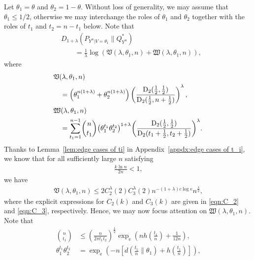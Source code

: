 \documentclass[journal, 10pt]{IEEEtran}
\newcommand{\rme}{\mathrm{e}}
\newcommand{\mfrakV}{\mathfrak{V}}
\newcommand{\mfrakW}{\mathfrak{W}}
\theoremstyle{plain}
\theoremstyle{plain}
\theoremstyle{plain}
\theoremstyle{plain}
\newcommand{\opD}{\operatorname{D}}
\begin{document}
\begin{IEEEproof}
Let $\theta_1=\theta$ and $\theta_2=1-\theta$. Without loss of generality, we may assume that $\theta_1\le 1/2$, otherwise we may interchange the roles of $\theta_1$ and $\theta_2$ together with the roles of $t_1$ and $t_2=n-t_1$ below. Note that
\begin{align}
&D_{1+\lambda}(P_{Y^n|V=\theta_1}\| Q^{\ast}_{Y^n})  \nonumber \\
&\qquad = \frac{1}{\lambda} \log (\mfrakV(\lambda, \theta_1, n) +\mfrakW(\lambda, \theta_1, n))\text{,} \label{eqn:term_in_square_bracket}
\end{align}
where
\begin{align}
&\mfrakV(\lambda, \theta_1, n) \nonumber \\
&\quad = \left( \theta_1^{n(1+\lambda)}+  \theta_2^{n(1+\lambda)} \right)\left(  \frac{\opD_{2}(\frac12, \frac12)}{\opD_2(\frac12, n+\frac12)} \right)^\lambda\text{,} \label{eqn:def:frakV-k=2} \\
&\mfrakW(\lambda, \theta_1, n) \nonumber \\
&\quad =\sum_{t_1=1}^{n-1}\hspace{-0.5mm} \binom{n}{t_1} \hspace{-0.5mm} \left( \theta_1^{t_1} \theta_2^{t_2} \right)^{1+\lambda} \hspace{-0.5mm}\bigg(\frac{\opD_{2}(\frac12, \frac12)}{\opD_2(t_1+\frac12, t_2+\frac12)} \bigg)^\lambda\text{.} \label{eqn:def:frakW-k=2}
\end{align}
Thanks to Lemma~\ref{lem:edge cases of ti} in Appendix~\ref{appdx:edge cases of t_i}, we know that for all sufficiently large $n$ satisfying
\begin{align}
	\frac{k\ln n}{2n}<1\text{,}
\end{align}
we have
\begin{align}
\mfrakV(\lambda, \theta_1, n) \le  2C_2^\lambda(2) C_3^\lambda(2)n^{-(1+\lambda)c\log \rme }n^{\frac{\lambda}{2}}\text{,} \label{k=2_upp_bound_1}
\end{align}
where the explicit expressions for $C_2(k)$ and $C_3(k)$ are given in \eqref{eqn:C_2} and \eqref{eqn:C_3}, respectively. Hence, we may now focus attention on $\mfrakW(\lambda, \theta_1, n) $. Note that
\begin{align}
 \binom{n}{t_1} &\le \left(\frac{n}{2\pi t_1t_2}\right)^\frac12 
\exp_\rme\left(nh\left(\tfrac{t_1}{n}\right)+\tfrac{1}{12n}\right)  \label{bdaa} \text{,} \\
 \theta_1^{t_1} \theta_2^{t_2}  &=\exp_\rme \left(-n\left[ d\left(\tfrac{t_1}{n} \|\theta_1\right)+h\left(\tfrac{t_1}{n}\right) \right] \right) \text{,} \label{bdab} 

\end{align}
\end{IEEEproof}
\end{document}
